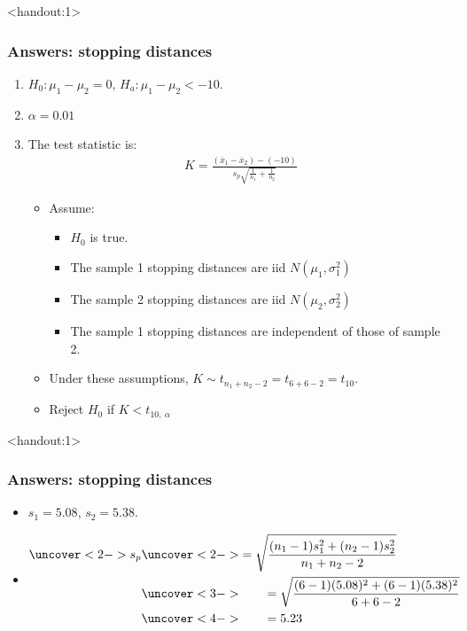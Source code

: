 \documentclass[handout]{beamer}\usepackage{graphicx, color}
\newcommand{\answers}{1}
\providecommand{\ov}[1]{\overline{#1}}
\numberwithin{equation}{section}
\begin{document}
\begin{frame}<handout:\answers>
\frametitle{Answers: stopping distances}
\begin{enumerate}[1. ]
\item $H_0:  \mu_1 - \mu_2 = 0$, $H_a: \mu_1 - \mu_2 < -10$. 
\pause \item $\alpha = 0.01$
\pause \item The test statistic is:
\pause \begin{align*}
K = \frac{(\ov{x}_1 - \ov{x}_2) - (-10)}{s_p \sqrt{\frac{1}{n_1} + \frac{1}{n_2}}}
\end{align*}
\begin{itemize}
\pause \item Assume:
\begin{itemize}
\pause \item $H_0$ is true.
\pause \item The sample 1 stopping distances are iid $N(\mu_1, \sigma^2_1)$
\pause \item The sample 2 stopping distances are iid $N(\mu_2, \sigma^2_2)$
\pause \item The sample 1 stopping distances are independent of those of sample 2.
\end{itemize}
\pause \item Under these assumptions, $K \sim t_{n_1 + n_2 - 2} = t_{6 + 6 - 2} = t_{10}$.
\pause \item Reject $H_0$ if $K < t_{10, \  \alpha}$
\end{itemize}
\setcounter{saveenum}{\value{enumi}}
\end{enumerate}
\end{frame}


\begin{frame}<handout:\answers>
\frametitle{Answers: stopping distances}
\begin{itemize}
\item $s_1 = 5.08$, $s_2 = 5.38$.
\item 
\begin{align*}
\uncover<2->{s_p} &\uncover<2->{= \sqrt{\frac{(n_1 - 1)s_1^2 + (n_2 - 1)s_2^2}{n_1 + n_2 - 2}}} \\
 &\uncover<3->{ \qquad = \sqrt{\frac{(6 - 1)(5.08)^2 + (6 - 1)(5.38)^2}{6 + 6 - 2}} }\\
 &\uncover<4->{ \qquad = 5.23}
\end{align*}
\end{itemize}
\end{frame}
\end{document}
